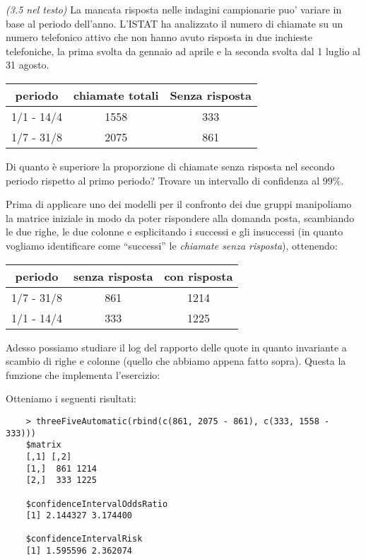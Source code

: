 \begin{exercise}{\emph{(3.5 nel testo)}}
  La mancata risposta nelle indagini campionarie puo' variare in base
  al periodo dell'anno. L'ISTAT ha analizzato il numero di chiamate su
  un numero telefonico attivo che non hanno avuto risposta in due
  inchieste telefoniche, la prima svolta da gennaio ad aprile e la
  seconda svolta dal 1 luglio al 31 agosto.
  \begin{table}[h]              %
    \centering
    \begin{tabular}{|c|c|c|}
      \hline
      periodo & chiamate totali & Senza risposta \\\hline
      1/1 - 14/4 & 1558 & 333 \\
      1/7 - 31/8 & 2075 & 861  \\ \hline
    \end{tabular}
  \end{table}
  Di quanto \`e superiore la proporzione di chiamate senza risposta
  nel secondo periodo rispetto al primo periodo? Trovare un intervallo
  di confidenza al 99\%.  
\end{exercise}
Prima di applicare uno dei modelli per il confronto dei due gruppi
manipoliamo la matrice iniziale in modo da poter rispondere alla
domanda posta, scambiando le due righe, le due colonne e esplicitando
i successi e gli insuccessi (in quanto vogliamo identificare come
``successi'' le \emph{chiamate senza risposta}), ottenendo:
  \begin{table}[h]              %
    \centering
    \begin{tabular}{|c|c|c|}
      \hline
      periodo & senza risposta & con risposta\\\hline
      1/7 - 31/8 & 861 & 1214 \\
      1/1 - 14/4 & 333 & 1225 \\\hline
    \end{tabular}
  \end{table}
  Adesso possiamo studiare il log del rapporto delle quote in quanto
  invariante a scambio di righe e colonne (quello che abbiamo appena
  fatto sopra). Questa la funzione che implementa l'esercizio:
  
  Otteniamo i seguenti risultati:
  \begin{lstlisting}
    > threeFiveAutomatic(rbind(c(861, 2075 - 861), c(333, 1558 - 333)))
    $matrix
    [,1] [,2]
    [1,]  861 1214
    [2,]  333 1225

    $confidenceIntervalOddsRatio
    [1] 2.144327 3.174400

    $confidenceIntervalRisk
    [1] 1.595596 2.362074
\end{lstlisting}
